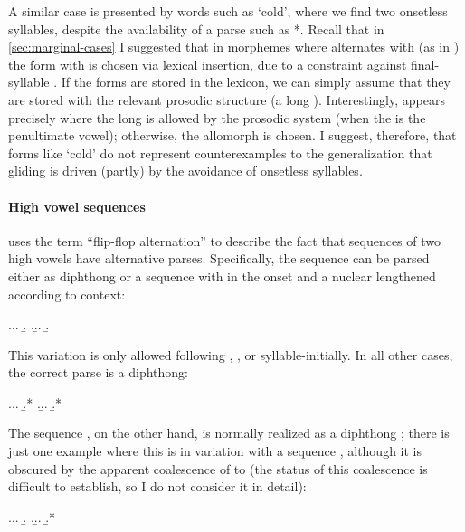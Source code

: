 A similar case is presented by words such as \ipa{[ˈuːer]} `cold', where we find two onsetless syllables, despite the availability of a parse such as *\ipa{[ˈweːr]}. Recall that in \cref{sec:marginal-cases} I suggested that in morphemes where \ipa{[ue]} alternates with \ipa{[oi]} (as in \alternation{[ˈuːer]}{[ˈoiri]}) the form with \ipa{[ue]} is chosen via lexical insertion, due to a constraint against final-syllable \ipa{[oi]}. If the \ipa{[ue]} forms are stored in the lexicon, we can simply assume that they are stored with the relevant prosodic structure (\ie a long \ipa{[uː]}). Interestingly, \ipa{[ue]} appears precisely where the long \ipa{[uː]} is allowed by the prosodic system (\ie when the \ipa{[u]} is the penultimate vowel); otherwise, the \ipa{[oi]} allomorph is chosen. I suggest, therefore, that forms like \ipa{[ˈuːer]} `cold' do not represent counterexamples to the generalization that gliding is driven (partly) by the avoidance of onsetless syllables.


\paragraph{High vowel sequences}
\label{sec:flip-flop-altern}

\citet{awbery86:_pembr_welsh} uses the term \enquote{flip-flop alternation} to describe the fact that sequences of two high vowels have alternative parses. Specifically, the sequence  can be parsed either as diphthong \ipa{[ui]} or a sequence \ipa{[wi(ː)]} with  in the onset and a nuclear \ipa{[i]} lengthened according to context:

\ex.\a.\a.
\b.\mbi{[ˈuiθ]}
\z.\b.\a.
\b.\mbi{[ˈkanuiɬ]}

This variation is only allowed following \ipa{[ɡ]}, \ipa{[h]}, or syllable-initially. In all other cases, the correct parse is a diphthong:

\ex.\a.\a.
\b.*\mbi{[ˈkwiːs]}
\z.\b.\a.
\b.*\mbi{[ˈɬwiːd]}

The sequence , on the other hand, is normally realized as a diphthong \ipa{[iu]}; there is just one example where this  is in variation with a sequence , although it is obscured by the apparent coalescence of \ipa{[sj]} to  (the status of this coalescence is difficult to establish, so I do not consider it in detail):

\ex.\a.\a.
\b.\mbi{[ˈsiur]}
\z.\b.\a.
\b.*\mbi{[ˈɬjuː]}

